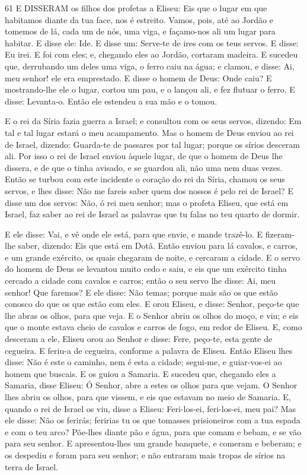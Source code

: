 \medskip

\lettrine{6} 1 E DISSERAM os filhos dos profetas a Eliseu: Eis
que o lugar em que habitamos diante da tua face, nos é estreito.
Vamos, pois, até ao Jordão e tomemos de lá, cada um de nós, uma
viga, e façamo-nos ali um lugar para habitar. E disse ele: Ide.
E disse um: Serve-te de ires com os teus servos. E disse: Eu
irei. E foi com eles; e, chegando eles ao Jordão, cortaram
madeira. E sucedeu que, derrubando um deles uma viga, o ferro
caiu na água; e clamou, e disse: Ai, meu senhor! ele era emprestado.
E disse o homem de Deus: Onde caiu? E mostrando-lhe ele o lugar,
cortou um pau, e o lançou ali, e fez flutuar o ferro. E disse:
Levanta-o. Então ele estendeu a sua mão e o tomou.

E o rei da Síria fazia guerra a Israel; e consultou com os seus
servos, dizendo: Em tal e tal lugar estará o meu acampamento.
Mas o homem de Deus enviou ao rei de Israel, dizendo: Guarda-te
de passares por tal lugar; porque os sírios desceram ali. Por
isso o rei de Israel enviou àquele lugar, de que o homem de Deus lhe
dissera, e de que o tinha avisado, e se guardou ali, não uma nem
duas vezes. Então se turbou com este incidente o coração do
rei da Síria, chamou os seus servos, e lhes disse: Não me fareis
saber quem dos nossos é pelo rei de Israel? E disse um dos
servos: Não, ó rei meu senhor; mas o profeta Eliseu, que está em
Israel, faz saber ao rei de Israel as palavras que tu falas no teu
quarto de dormir.

E ele disse: Vai, e vê onde ele está, para que envie, e mande
trazê-lo. E fizeram-lhe saber, dizendo: Eis que está em Dotã.
Então enviou para lá cavalos, e carros, e um grande exército,
os quais chegaram de noite, e cercaram a cidade. E o servo do
homem de Deus se levantou muito cedo e saiu, e eis que um exército
tinha cercado a cidade com cavalos e carros; então o seu servo lhe
disse: Ai, meu senhor! Que faremos? E ele disse: Não temas;
porque mais são os que estão conosco do que os que estão com eles.
E orou Eliseu, e disse: Senhor, peço-te que lhe abras os
olhos, para que veja. E o Senhor abriu os olhos do moço, e viu; e
eis que o monte estava cheio de cavalos e carros de fogo, em redor
de Eliseu. E, como desceram a ele, Eliseu orou ao Senhor e
disse: Fere, peço-te, esta gente de cegueira. E feriu-a de cegueira,
conforme a palavra de Eliseu. Então Eliseu lhes disse: Não é
este o caminho, nem é esta a cidade; segui-me, e guiar-vos-ei ao
homem que buscais. E os guiou a Samaria. E sucedeu que,
chegando eles a Samaria, disse Eliseu: Ó Senhor, abre a estes os
olhos para que vejam. O Senhor lhes abriu os olhos, para que vissem,
e eis que estavam no meio de Samaria. E, quando o rei de
Israel os viu, disse a Eliseu: Feri-los-ei, feri-los-ei, meu pai?
Mas ele disse: Não os ferirás; feririas tu os que tomasses
prisioneiros com a tua espada e com o teu arco? Põe-lhes diante pão
e água, para que comam e bebam, e se vão para seu senhor. E
apresentou-lhes um grande banquete, e comeram e beberam; e os
despediu e foram para seu senhor; e não entraram mais tropas de
sírios na terra de Israel.

